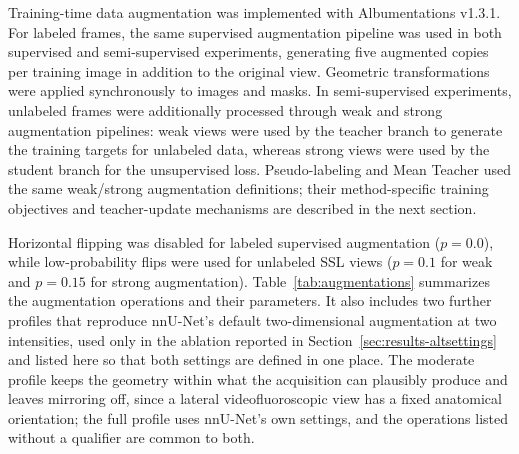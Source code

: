 \documentclass[
  msc,
  american
]{ThesisPUC_v2}
\begin{document}
Training-time data augmentation was implemented with Albumentations v1.3.1. For labeled frames, the same supervised augmentation pipeline was used in both supervised and semi-supervised experiments, generating five augmented copies per training image in addition to the original view. Geometric transformations were applied synchronously to images and masks. In semi-supervised experiments, unlabeled frames were additionally processed through weak and strong augmentation pipelines: weak views were used by the teacher branch to generate the training targets for unlabeled data, whereas strong views were used by the student branch for the unsupervised loss. Pseudo-labeling and Mean Teacher used the same weak/strong augmentation definitions; their method-specific training objectives and teacher-update mechanisms are described in the next section.

Horizontal flipping was disabled for labeled supervised augmentation ($p=0.0$), while low-probability flips were used for unlabeled SSL views ($p=0.1$ for weak and $p=0.15$ for strong augmentation). Table~\ref{tab:augmentations} summarizes the augmentation operations and their parameters. It also includes two further profiles that reproduce nnU-Net's default two-dimensional augmentation at two intensities, used only in the ablation reported in Section~\ref{sec:results-altsettings} and listed here so that both settings are defined in one place. The moderate profile keeps the geometry within what the acquisition can plausibly produce and leaves mirroring off, since a lateral videofluoroscopic view has a fixed anatomical orientation; the full profile uses nnU-Net's own settings, and the operations listed without a qualifier are common to both.
\end{document}
